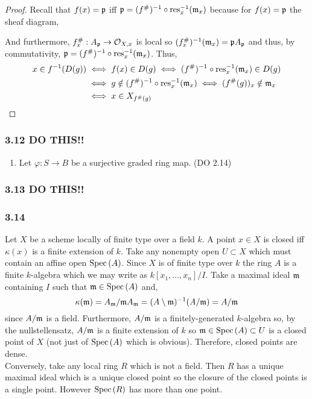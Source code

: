 \documentclass[12pt]{article}
\begin{document}
\begin{proof}
Recall that $f(x) = \mathfrak{p}$ iff $\mathfrak{p} = (f^\#)^{-1} \circ \mathrm{res}_x^{-1}(\mathfrak{m}_x)$ because for $f(x) = \mathfrak{p}$ the sheaf diagram,
\begin{center}
\end{center} 
And furthermore, $f^\#_x : A_{\mathfrak{p}} \to \mathcal{O}_{X, x}$ is local so $(f^\#_x)^{-1}(\mathfrak{m}_x) = \mathfrak{p} A_{\mathfrak{p}}$ and thus, by commutativity, $\mathfrak{p} = (f^\#)^{-1} \circ \mathrm{res}_x^{-1}(\mathfrak{m}_x)$. 
Thus,
\begin{align*}
x \in f^{-1}(D(g)) & \iff f(x) \in D(g) \iff (f^\#)^{-1} \circ \mathrm{res}_x^{-1} (\mathfrak{m}_x) \in D(g) 
\\
& \iff g \notin (f^\#)^{-1} \circ \mathrm{res}_{x}^{-1} (\mathfrak{m}_x) \iff (f^\#(g))_x \notin \mathfrak{m}_x 
\\
& \iff x \in X_{f^\#(g)}
\end{align*}
\end{proof}

\subsubsection{3.12 DO THIS!!}

\begin{enumerate}
\item Let $\varphi : S \to B$ be a surjective graded ring map. (DO 2.14)
\end{enumerate}

\subsubsection{3.13 DO THIS!!}

\subsubsection{3.14}

Let $X$ be a scheme locally of finite type over a field $k$. A point $x \in X$ is closed iff $\kappa(x)$ is a finite extension of $k$. Take any nonempty open $U \subset X$ which must contain an affine open $\mathrm{Spec}\left( A \right)$. Since $X$ is of finite type over $k$ the ring $A$ is a finite $k$-algebra which we may write as $k[x_1, \dots, x_n]/I$. Take a maximal ideal $\mathfrak{m}$ containing $I$ such that $\mathfrak{m} \in \mathrm{Spec}\left( A \right)$ and,
\[ \kappa(\mathfrak{m}) = A_{\mathfrak{m}} / \mathfrak{m} A_{\mathfrak{m}} = (A \setminus \mathfrak{m})^{-1} (A / \mathfrak{m}) = A / \mathfrak{m} \]
since $A / \mathfrak{m}$ is a field. Furthermore, $A / \mathfrak{m}$ is a finitely-generated $k$-algebra so, by the nullstellensatz, $A / \mathfrak{m}$ is a finite extension of $k$ so $\mathfrak{m} \in \mathrm{Spec}\left( A \right) \subset U$ is a closed point of $X$ (not just of $\mathrm{Spec}\left( A \right)$ which is obvious). Therefore, closed points are dense. 
\bigskip\\
Conversely, take any local ring $R$ which is not a field. Then $R$ has a unique maximal ideal which is a unique closed point so the closure of the closed points is a single point. However $\mathrm{Spec}\left( R \right)$ has more than one point.  
\end{document}
